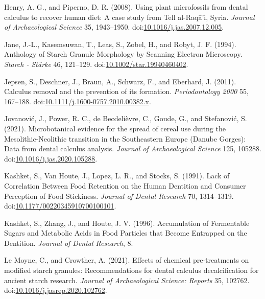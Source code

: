 \documentclass[utf8]{frontiers/frontiersSCNS}
\newlength{\cslhangindent}
\newlength{\cslentryspacingunit} %
\newenvironment{CSLReferences}[2] %
 {%
  \setlength{\parindent}{0pt}
  \ifodd #1
  \let\oldpar\par
  \def\par{\hangindent=\cslhangindent\oldpar}
  \fi
  \setlength{\parskip}{#2\cslentryspacingunit}
 }%
 {}
\begin{document}
\begin{CSLReferences}{1}{0}
\leavevmode{}%
Henry, A. G., and Piperno, D. R. (2008). Using plant microfossils from dental calculus to recover human diet: A case study from {Tell} al-{Raqā}'i, {Syria}. \emph{Journal of Archaeological Science} 35, 1943--1950. doi:\href{https://doi.org/10.1016/j.jas.2007.12.005}{10.1016/j.jas.2007.12.005}.

\leavevmode{}%
Jane, J.-L., Kasemsuwan, T., Leas, S., Zobel, H., and Robyt, J. F. (1994). Anthology of {Starch Granule Morphology} by {Scanning Electron Microscopy}. \emph{Starch - Stärke} 46, 121--129. doi:\href{https://doi.org/10.1002/star.19940460402}{10.1002/star.19940460402}.

\leavevmode{}%
Jepsen, S., Deschner, J., Braun, A., Schwarz, F., and Eberhard, J. (2011). Calculus removal and the prevention of its formation. \emph{Periodontology 2000} 55, 167--188. doi:\href{https://doi.org/10.1111/j.1600-0757.2010.00382.x}{10.1111/j.1600-0757.2010.00382.x}.

\leavevmode{}%
Jovanović, J., Power, R. C., de Becdelièvre, C., Goude, G., and Stefanović, S. (2021). Microbotanical evidence for the spread of cereal use during the {Mesolithic-Neolithic} transition in the {Southeastern Europe} ({Danube Gorges}): {Data} from dental calculus analysis. \emph{Journal of Archaeological Science} 125, 105288. doi:\href{https://doi.org/10.1016/j.jas.2020.105288}{10.1016/j.jas.2020.105288}.

\leavevmode{}%
Kashket, S., Van Houte, J., Lopez, L. R., and Stocks, S. (1991). Lack of {Correlation Between Food Retention} on the {Human Dentition} and {Consumer Perception} of {Food Stickiness}. \emph{Journal of Dental Research} 70, 1314--1319. doi:\href{https://doi.org/10.1177/00220345910700100101}{10.1177/00220345910700100101}.

\leavevmode{}%
Kashket, S., Zhang, J., and Houte, J. V. (1996). Accumulation of {Fermentable Sugars} and {Metabolic Acids} in {Food Particles} that {Become Entrapped} on the {Dentition}. \emph{Journal of Dental Research}, 8.

\leavevmode{}%
Le Moyne, C., and Crowther, A. (2021). Effects of chemical pre-treatments on modified starch granules: {Recommendations} for dental calculus decalcification for ancient starch research. \emph{Journal of Archaeological Science: Reports} 35, 102762. doi:\href{https://doi.org/10.1016/j.jasrep.2020.102762}{10.1016/j.jasrep.2020.102762}.


\end{CSLReferences}
\end{document}
